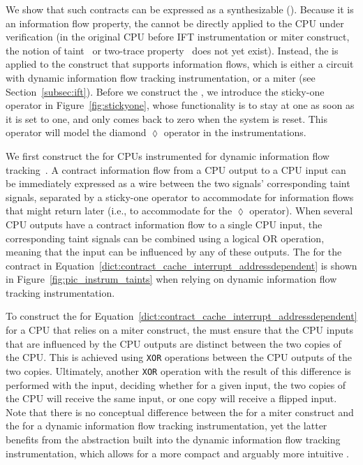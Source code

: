 
We show that such contracts can be expressed as a synthesizable \pici (\PICI).
Because it is an information flow property, the \PICI cannot be directly applied to the CPU under verification (in the original CPU before IFT instrumentation or miter construct, the notion of taint~\cite{solt2022cellift,ceesay2024mucfi} or two-trace property~\cite{wang2023specification,dinesh2024conjunct,dinesh2024conjunct,tan2025contractshadowlogic} does not yet exist).
Instead, the \PICI is applied to the construct that supports information flows, which is either a circuit with dynamic information flow tracking instrumentation, or a miter (see Section~\ref{subsec:ift}).
Before we construct the \PICI, we introduce the sticky-one operator in Figure~\ref{fig:stickyone}, whose functionality is to stay at one as soon as it is set to one, and only comes back to zero when the system is reset.
This operator will model the diamond $\lozenge$ operator in the instrumentations.

We first construct the \PICI for CPUs instrumented for dynamic information flow tracking~\cite{tiwari2009complete,solt2022cellift}.
A contract information flow from a CPU output to a CPU input can be immediately expressed as a wire between the two signals' corresponding taint signals, separated by a sticky-one operator to accommodate for information flows that might return later (i.e., to accommodate for the $\lozenge$ operator).
When several CPU outputs have a contract information flow to a single CPU input, the corresponding taint signals can be combined using a logical OR operation, meaning that the input can be influenced by any of these outputs.
The \PICI for the contract in Equation~\ref{dict:contract_cache_interrupt_addressdependent} is shown in Figure~\ref{fig:pic_instrum_taints} when relying on dynamic information flow tracking instrumentation.

To construct the \PICI for Equation~\ref{dict:contract_cache_interrupt_addressdependent} for a CPU that relies on a miter construct, the \PICI must ensure that the CPU inputs that are influenced by the CPU outputs are distinct between the two copies of the CPU.
This is achieved using \texttt{XOR} operations between the CPU outputs of the two copies.
Ultimately, another \texttt{XOR} operation with the result of this difference is performed with the input, deciding whether for a given input, the two copies of the CPU will receive the same input, or one copy will receive a flipped input.
Note that there is no conceptual difference between the \PICI for a miter construct and the \PICI for a dynamic information flow tracking instrumentation, yet the latter benefits from the abstraction built into the dynamic information flow tracking instrumentation, which allows for a more compact and arguably more intuitive \PICI.

